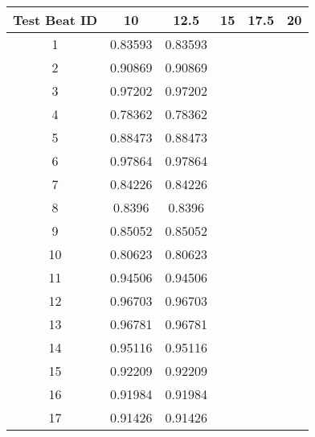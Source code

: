 \begin{tabular}{|c|c|c|c|c|c|}
\hline 
Test Beat ID & 10 & 12.5 & 15 & 17.5 & 20 \\ 
\hline 
1 & 0.83593 & 0.83593 &  &  &  \\ 
2 & 0.90869 & 0.90869 &  &  &  \\ 
3 & 0.97202 & 0.97202 &  &  &  \\ 
4 & 0.78362 & 0.78362 &  &  &  \\ 
5 & 0.88473 & 0.88473 &  &  &  \\ 
6 & 0.97864 & 0.97864 &  &  &  \\ 
7 & 0.84226 & 0.84226 &  &  &  \\ 
8 & 0.8396 & 0.8396 &  &  &  \\ 
9 & 0.85052 & 0.85052 &  &  &  \\ 
10 & 0.80623 & 0.80623 &  &  &  \\ 
11 & 0.94506 & 0.94506 &  &  &  \\ 
12 & 0.96703 & 0.96703 &  &  &  \\ 
13 & 0.96781 & 0.96781 &  &  &  \\ 
14 & 0.95116 & 0.95116 &  &  &  \\ 
15 & 0.92209 & 0.92209 &  &  &  \\ 
16 & 0.91984 & 0.91984 &  &  &  \\ 
17 & 0.91426 & 0.91426 &  &  &  \\ 
\hline 
\end{tabular}